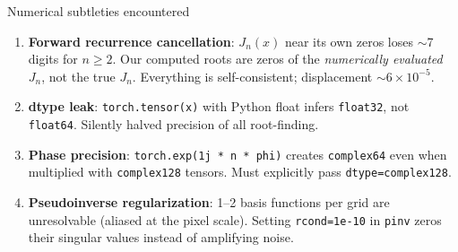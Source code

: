 \documentclass[aspectratio=169]{beamer}
\begin{document}
\begin{frame}{Numerical subtleties encountered}
  \begin{enumerate}
    \item \textbf{Forward recurrence cancellation}: $J_n(x)$ near its own zeros loses $\sim$7 digits for $n \geq 2$.
    Our computed roots are zeros of the \emph{numerically evaluated} $J_n$, not the true $J_n$.
    Everything is self-consistent; displacement $\sim 6 \times 10^{-5}$.

    \smallskip

    \item \textbf{dtype leak}: \texttt{torch.tensor(x)} with Python float infers \texttt{float32}, not \texttt{float64}. Silently halved precision of all root-finding.

    \smallskip

    \item \textbf{Phase precision}: \texttt{torch.exp(1j * n * phi)} creates \texttt{complex64} even when multiplied with \texttt{complex128} tensors. Must explicitly pass \texttt{dtype=complex128}.

    \smallskip

    \item \textbf{Pseudoinverse regularization}: 1--2 basis functions per grid are unresolvable (aliased at the pixel scale). Setting \texttt{rcond=1e-10} in \texttt{pinv} zeros their singular values instead of amplifying noise.
  \end{enumerate}
\end{frame}
\end{document}
